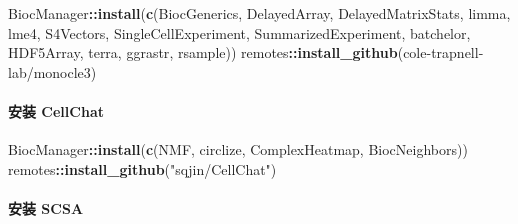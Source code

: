 \documentclass[
]{article}
\newenvironment{Shaded}{\begin{snugshade}}{\end{snugshade}}
\newcommand{\KeywordTok}[1]{\textcolor[rgb]{0.13,0.29,0.53}{\textbf{#1}}}
\newcommand{\NormalTok}[1]{#1}
\newcommand{\OperatorTok}[1]{\textcolor[rgb]{0.81,0.36,0.00}{\textbf{#1}}}
\newcommand{\StringTok}[1]{\textcolor[rgb]{0.31,0.60,0.02}{#1}}
\begin{document}
\begin{Shaded}
\begin{Highlighting}[]
\NormalTok{BiocManager}\OperatorTok{::}\KeywordTok{install}\NormalTok{(}\KeywordTok{c}\NormalTok{(}\StringTok{\textquotesingle{}BiocGenerics\textquotesingle{}}\NormalTok{, }\StringTok{\textquotesingle{}DelayedArray\textquotesingle{}}\NormalTok{, }\StringTok{\textquotesingle{}DelayedMatrixStats\textquotesingle{}}\NormalTok{,}
    \StringTok{\textquotesingle{}limma\textquotesingle{}}\NormalTok{, }\StringTok{\textquotesingle{}lme4\textquotesingle{}}\NormalTok{, }\StringTok{\textquotesingle{}S4Vectors\textquotesingle{}}\NormalTok{, }\StringTok{\textquotesingle{}SingleCellExperiment\textquotesingle{}}\NormalTok{,}
    \StringTok{\textquotesingle{}SummarizedExperiment\textquotesingle{}}\NormalTok{, }\StringTok{\textquotesingle{}batchelor\textquotesingle{}}\NormalTok{, }\StringTok{\textquotesingle{}HDF5Array\textquotesingle{}}\NormalTok{,}
    \StringTok{\textquotesingle{}terra\textquotesingle{}}\NormalTok{, }\StringTok{\textquotesingle{}ggrastr\textquotesingle{}}\NormalTok{, }\StringTok{\textquotesingle{}rsample\textquotesingle{}}\NormalTok{))}
\NormalTok{remotes}\OperatorTok{::}\KeywordTok{install\_github}\NormalTok{(}\StringTok{\textquotesingle{}cole{-}trapnell{-}lab/monocle3\textquotesingle{}}\NormalTok{)}
\end{Highlighting}
\end{Shaded}

\hypertarget{ux5b89ux88c5-cellchat}{%
\paragraph{安装 CellChat}\label{ux5b89ux88c5-cellchat}}

\begin{Shaded}
\begin{Highlighting}[]
\NormalTok{BiocManager}\OperatorTok{::}\KeywordTok{install}\NormalTok{(}\KeywordTok{c}\NormalTok{(}\StringTok{\textquotesingle{}NMF\textquotesingle{}}\NormalTok{, }\StringTok{\textquotesingle{}circlize\textquotesingle{}}\NormalTok{, }\StringTok{\textquotesingle{}ComplexHeatmap\textquotesingle{}}\NormalTok{, }\StringTok{\textquotesingle{}BiocNeighbors\textquotesingle{}}\NormalTok{))}
\NormalTok{remotes}\OperatorTok{::}\KeywordTok{install\_github}\NormalTok{(}\StringTok{"sqjin/CellChat"}\NormalTok{)}
\end{Highlighting}
\end{Shaded}

\hypertarget{ux5b89ux88c5-scsa}{%
\paragraph{安装 SCSA}\label{ux5b89ux88c5-scsa}}
\end{document}
